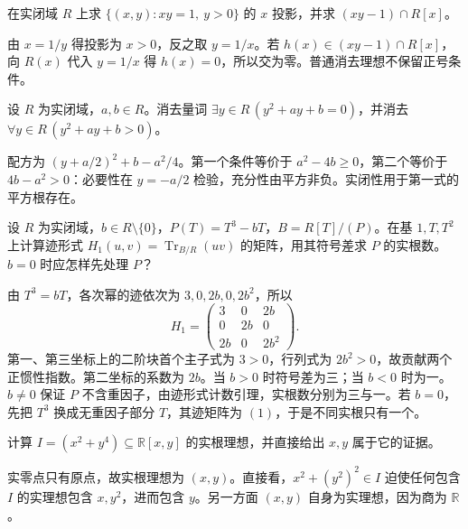 \begin{exercise}\label{b3:ex:G-projection-hyperbola}
	在实闭域 \(R\) 上求 \(\{(x,y):xy=1,\ y>0\}\) 的 \(x\) 投影，并求 \((xy-1)\cap R[x]\)。
\end{exercise}
\begin{solution}
	由 \(x=1/y\) 得投影为 \(x>0\)，反之取 \(y=1/x\)。若 \(h(x)\in(xy-1)\cap R[x]\)，向 \(R(x)\) 代入 \(y=1/x\) 得 \(h(x)=0\)，所以交为零。普通消去理想不保留正号条件。
\end{solution}

\begin{exercise}\label{b3:ex:G-parametric-quadratic}
	设 \(R\) 为实闭域，\(a,b\in R\)。消去量词 \(\exists y\in R\,(y^2+ay+b=0)\)，并消去 \(\forall y\in R\,(y^2+ay+b>0)\)。
\end{exercise}
\begin{solution}
	配方为 \((y+a/2)^2+b-a^2/4\)。第一个条件等价于 \(a^2-4b\ge0\)，第二个等价于 \(4b-a^2>0\)：必要性在 \(y=-a/2\) 检验，充分性由平方非负。实闭性用于第一式的平方根存在。
\end{solution}

\begin{exercise}\label{b3:ex:G-trace-cubic}
	设 \(R\) 为实闭域，\(b\in R\setminus\{0\}\)，\(P(T)=T^3-bT\)，\(B=R[T]/(P)\)。在基 \(1,T,T^2\) 上计算迹形式 \(H_1(u,v)=\operatorname{Tr}_{B/R}(uv)\) 的矩阵，用其符号差求 \(P\) 的实根数。\(b=0\) 时应怎样先处理 \(P\)？
\end{exercise}
\begin{solution}
	由 \(T^3=bT\)，各次幂的迹依次为 \(3,0,2b,0,2b^2\)，所以
	\[
		H_1=\begin{pmatrix}3&0&2b\\0&2b&0\\2b&0&2b^2\end{pmatrix}.
	\]
	第一、第三坐标上的二阶块首个主子式为 \(3>0\)，行列式为 \(2b^2>0\)，故贡献两个正惯性指数。第二坐标的系数为 \(2b\)。当 \(b>0\) 时符号差为三；当 \(b<0\) 时为一。\(b\ne0\) 保证 \(P\) 不含重因子，由迹形式计数引理，实根数分别为三与一。若 \(b=0\)，先把 \(T^3\) 换成无重因子部分 \(T\)，其迹矩阵为 \((1)\)，于是不同实根只有一个。
\end{solution}

\begin{exercise}\label{b3:ex:G-real-radical-powers}
	计算 \(I=(x^2+y^4)\subseteq\mathbb R[x,y]\) 的实根理想，并直接给出 \(x,y\) 属于它的证据。
\end{exercise}
\begin{solution}
	实零点只有原点，故实根理想为 \((x,y)\)。直接看，\(x^2+(y^2)^2\in I\) 迫使任何包含 \(I\) 的实理想包含 \(x,y^2\)，进而包含 \(y\)。另一方面 \((x,y)\) 自身为实理想，因为商为 \(\mathbb R\)。
\end{solution}

